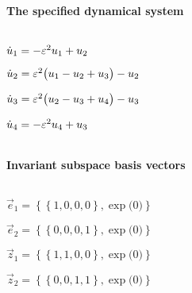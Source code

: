 
\(\)
\paragraph{The specified dynamical system}
\(
\)\par

\(\dot u_{1}=-\varepsilon^{2} u\sb1+u\sb2
\)\par

\(\dot u_{2}=\varepsilon^{2} \big(u\sb1-u\sb2+u\sb3\big)-u\sb2
\)\par

\(\dot u_{3}=\varepsilon^{2} \big(u\sb2-u\sb3+u\sb4\big)-u\sb3
\)\par

\(\dot u_{4}=-\varepsilon^{2} u\sb4+u\sb3
\)\par

\(\)
\paragraph{Invariant subspace basis vectors}
\(
\)\par

\(\vec e_{1}=\left\{
\left\{
1 , 0 , 0 , 0
\right\} , \exp \big(0\big)
\right\}
\)\par

\(\vec e_{2}=\left\{
\left\{
0 , 0 , 0 , 1
\right\} , \exp \big(0\big)
\right\}
\)\par

\(\vec z_{1}=\left\{
\left\{
1 , 1 , 0 , 0
\right\} , \exp \big(0\big)
\right\}
\)\par

\(\vec z_{2}=\left\{
\left\{
0 , 0 , 1 , 1
\right\} , \exp \big(0\big)
\right\}
\)\par
